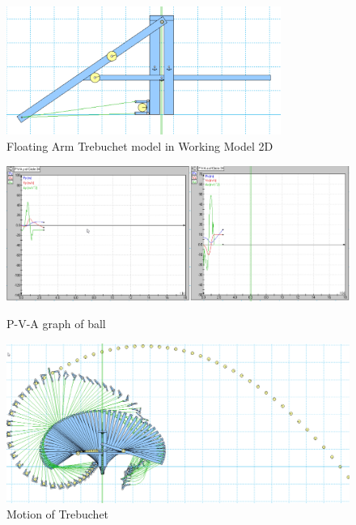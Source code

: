 \documentclass[12pt, titlepage]{article}
\begin{document}
    \begin{figure}[t]                                  
    \centering
    \includegraphics[width=0.8\textwidth]{Model.png}
    \caption{Floating Arm Trebuchet model in Working Model 2D\label{model}}
    \end{figure}

\begin{figure}[b]
    \begin{minipage}[t]{0.69\textwidth}
        \vspace{12pt}
        \begin{flushleft}
            \includegraphics[width=\textwidth]{Graphs.png}
        \end{flushleft}
        \caption{P-V-A graph of ball\label{graphs}}
    \end{minipage}
    \hfill
    \begin{minipage}[t]{0.3\textwidth}
        \vspace{50pt}
        \begin{flushright}
            \includegraphics[width=\textwidth]{Motion.png}
        \end{flushright}
        \caption{Motion of Trebuchet\label{motion}}
    \end{minipage}
\end{figure}
\end{document}
